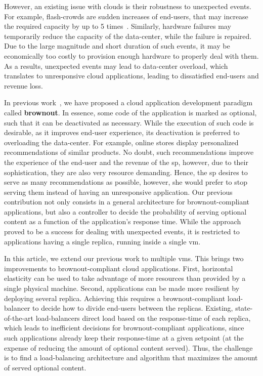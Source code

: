 However, an existing issue with clouds is their robustness to unexpected events. For example, flash-crowds are sudden increases of end-users, that may increase the required capacity by up to 5 times~\cite{Bodik10:SoCC}. Similarly, hardware failures may temporarily reduce the capacity of the data-center, while the failure is repaired. Due to the large magnitude and short duration of such events, it may be economically too costly to provision enough hardware to properly deal with them. As a results, unexpected events may lead to data-center overload, which translates to unresponsive cloud applications, leading to dissatisfied end-users and revenue loss.

In previous work~\cite{cloudish-tr}, we have proposed a cloud application development paradigm called {\bf brownout}. In essence, some code of the application is marked as optional, such that it can be deactivated as necessary. While the execution of such code is desirable, as it improves end-user experience, its deactivation is preferred to overloading the data-center. For example, online stores display personalized recommendations of similar products. No doubt, such recommendations improve the experience of the end-user and the revenue of the \ac{sp}, however, due to their sophistication, they are also very resource demanding. Hence, the \ac{sp} desires to serve as many recommendations as possible, however, she would prefer to stop serving them instead of having an unresponsive application. Our previous contribution not only consists in a general architecture for brownout-compliant applications, but also a controller to decide the probability of serving optional content as a function of the application's response time. While the approach proved to be a success for dealing with unexpected events, it is restricted to applications having a single replica, running inside a single \ac{vm}.

In this article, we extend our previous work to multiple \acp{vm}. This brings two improvements to brownout-compliant cloud applications. First, horizontal elasticity can be used to take advantage of more resources than provided by a single physical machine. Second, applications can be made more resilient by deploying several replica. Achieving this requires a brownout-compliant load-balancer to decide how to divide end-users between the replicas. Existing, state-of-the-art load-balancers direct load based on the response-time of each replica, which leads to inefficient decisions for brownout-compliant applications, since such applications already keep their response-time at a given setpoint (at the expense of reducing the amount of optional content served). Thus, the challenge is to find a load-balancing architecture and algorithm that maximizes the amount of served optional content.

